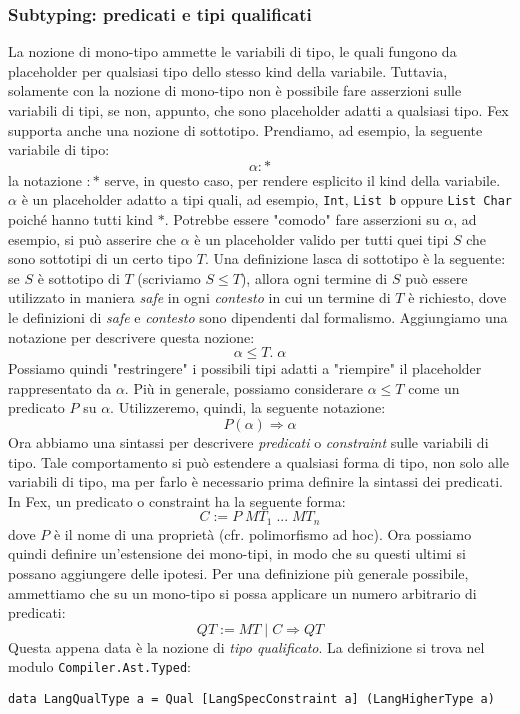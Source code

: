 \documentclass[10pt,a4paper]{article}
\begin{document}
\subsubsection{Subtyping: predicati e tipi qualificati}
La nozione di mono-tipo ammette le variabili di tipo, le quali fungono da placeholder per qualsiasi tipo dello stesso
kind della variabile. Tuttavia, solamente con la nozione di mono-tipo non è possibile fare asserzioni sulle variabili
di tipi, se non, appunto, che sono placeholder adatti a qualsiasi tipo. Fex supporta anche una nozione di sottotipo.
Prendiamo, ad esempio, la seguente variabile di tipo:
\[ \alpha : * \]
la notazione $ : * $ serve, in questo caso, per rendere esplicito il kind della variabile. $ \alpha $ è un placeholder
adatto a tipi quali, ad esempio, \texttt{Int}, \texttt{List b} oppure \texttt{List Char} poiché hanno tutti kind $ * $.
Potrebbe essere "comodo" fare asserzioni su $ \alpha $, ad esempio, si può asserire che $ \alpha $ è un placeholder
valido per tutti quei tipi $ S $ che sono sottotipi di un certo tipo $ T $. Una definizione lasca di sottotipo è la
seguente: se $ S $ è sottotipo di $ T $ (scriviamo $ S \leq T $), allora ogni termine di $ S $ può essere utilizzato
in maniera \textit{safe} in ogni \textit{contesto} in cui un termine di $ T $ è richiesto, dove le definizioni di
\textit{safe} e \textit{contesto} sono dipendenti dal formalismo.
Aggiungiamo una notazione per descrivere questa nozione:
\[ \alpha \leq T . \; \alpha \]
Possiamo quindi "restringere" i possibili tipi adatti a "riempire" il placeholder rappresentato da $ \alpha $. Più in
generale, possiamo considerare $ \alpha \leq T $ come un predicato $ P $ su $ \alpha $. Utilizzeremo, quindi, la seguente
notazione:
\[ P(\alpha) \Rightarrow \alpha \]
Ora abbiamo una sintassi per descrivere \textit{predicati} o \textit{constraint} sulle variabili di tipo. Tale
comportamento si può estendere a qualsiasi forma di tipo, non solo alle variabili di tipo, ma per farlo è necessario
prima definire la sintassi dei predicati. In Fex, un predicato o constraint ha la seguente forma:
\[ C := P \; MT_1 \; ... \; MT_n \]
dove $ P $ è il nome di una proprietà (cfr. polimorfismo ad hoc). Ora possiamo quindi definire un'estensione dei
mono-tipi, in modo che su questi ultimi si possano aggiungere delle ipotesi. Per una definizione più generale possibile,
ammettiamo che su un mono-tipo si possa applicare un numero arbitrario di predicati:
\[ QT := MT \; | \; C \Rightarrow QT \]
Questa appena data è la nozione di \textit{tipo qualificato}. La definizione si trova nel modulo
\texttt{Compiler.Ast.Typed}:
\begin{lstlisting}
data LangQualType a = Qual [LangSpecConstraint a] (LangHigherType a)
\end{lstlisting}
\end{document}
